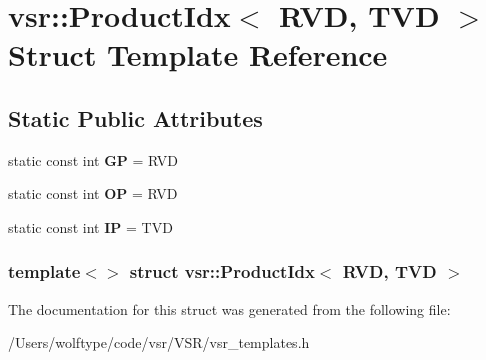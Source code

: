\hypertarget{structvsr_1_1_product_idx_3_01_r_v_d_00_01_t_v_d_01_4}{\section{vsr\-:\-:Product\-Idx$<$ R\-V\-D, T\-V\-D $>$ Struct Template Reference}
\label{structvsr_1_1_product_idx_3_01_r_v_d_00_01_t_v_d_01_4}
}
\subsection*{Static Public Attributes}
\begin{DoxyCompactItemize}
\item 
\hypertarget{structvsr_1_1_product_idx_3_01_r_v_d_00_01_t_v_d_01_4_aceb611eed664d38945034293c56e69cd}{static const int {\bfseries G\-P} = R\-V\-D}\label{structvsr_1_1_product_idx_3_01_r_v_d_00_01_t_v_d_01_4_aceb611eed664d38945034293c56e69cd}

\item 
\hypertarget{structvsr_1_1_product_idx_3_01_r_v_d_00_01_t_v_d_01_4_a2871d509626bd81b306cd93614dc72b5}{static const int {\bfseries O\-P} = R\-V\-D}\label{structvsr_1_1_product_idx_3_01_r_v_d_00_01_t_v_d_01_4_a2871d509626bd81b306cd93614dc72b5}

\item 
\hypertarget{structvsr_1_1_product_idx_3_01_r_v_d_00_01_t_v_d_01_4_af254b35f6016caf9772449b4518e496e}{static const int {\bfseries I\-P} = T\-V\-D}\label{structvsr_1_1_product_idx_3_01_r_v_d_00_01_t_v_d_01_4_af254b35f6016caf9772449b4518e496e}

\end{DoxyCompactItemize}
\subsubsection*{template$<$$>$ struct vsr\-::\-Product\-Idx$<$ R\-V\-D, T\-V\-D $>$}



The documentation for this struct was generated from the following file\-:\begin{DoxyCompactItemize}
\item 
/\-Users/wolftype/code/vsr/\-V\-S\-R/vsr\-\_\-templates.\-h\end{DoxyCompactItemize}
